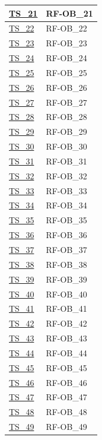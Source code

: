 \begin{longtable}{|
    >{\raggedright\arraybackslash}p{} |
    >{\centering\arraybackslash}p{} |
    }
    \hyperlink{ts-21}{TS\_21} & RF-OB\_21 \\ \hline
    \hyperlink{ts-22}{TS\_22} & RF-OB\_22 \\ \hline
    \hyperlink{ts-23}{TS\_23} & RF-OB\_23 \\ \hline
    \hyperlink{ts-24}{TS\_24} & RF-OB\_24 \\ \hline
    \hyperlink{ts-25}{TS\_25} & RF-OB\_25 \\ \hline
    \hyperlink{ts-26}{TS\_26} & RF-OB\_26 \\ \hline
    \hyperlink{ts-27}{TS\_27} & RF-OB\_27 \\ \hline
    \hyperlink{ts-28}{TS\_28} & RF-OB\_28 \\ \hline
    \hyperlink{ts-29}{TS\_29} & RF-OB\_29 \\ \hline
    \hyperlink{ts-30}{TS\_30} & RF-OB\_30 \\ \hline
    \hyperlink{ts-31}{TS\_31} & RF-OB\_31 \\ \hline
    \hyperlink{ts-32}{TS\_32} & RF-OB\_32 \\ \hline
    \hyperlink{ts-33}{TS\_33} & RF-OB\_33 \\ \hline
    \hyperlink{ts-34}{TS\_34} & RF-OB\_34 \\ \hline
    \hyperlink{ts-35}{TS\_35} & RF-OB\_35 \\ \hline
    \hyperlink{ts-36}{TS\_36} & RF-OB\_36 \\ \hline
    \hyperlink{ts-37}{TS\_37} & RF-OB\_37 \\ \hline
    \hyperlink{ts-38}{TS\_38} & RF-OB\_38 \\ \hline
    \hyperlink{ts-39}{TS\_39} & RF-OB\_39 \\ \hline
    \hyperlink{ts-40}{TS\_40} & RF-OB\_40 \\ \hline
    \hyperlink{ts-41}{TS\_41} & RF-OB\_41 \\ \hline
    \hyperlink{ts-42}{TS\_42} & RF-OB\_42 \\ \hline
    \hyperlink{ts-43}{TS\_43} & RF-OB\_43 \\ \hline
    \hyperlink{ts-44}{TS\_44} & RF-OB\_44 \\ \hline
    \hyperlink{ts-45}{TS\_45} & RF-OB\_45 \\ \hline
    \hyperlink{ts-46}{TS\_46} & RF-OB\_46 \\ \hline
    \hyperlink{ts-47}{TS\_47} & RF-OB\_47 \\ \hline
    \hyperlink{ts-48}{TS\_48} & RF-OB\_48 \\ \hline
    \hyperlink{ts-49}{TS\_49} & RF-OB\_49 \\ \hline

\end{longtable}
